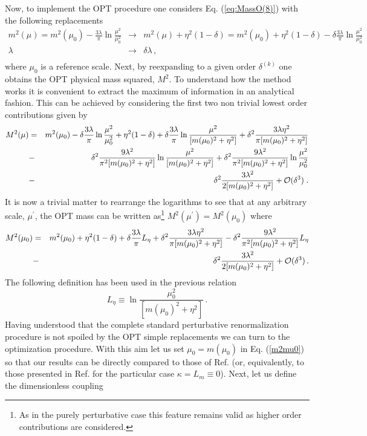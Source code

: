 \documentclass[a4paper,11pt]{article}
\def\nn{\nonumber}
\def\be{\begin{equation}}
\def\ee{\end{equation}}
\def\bea{\begin{eqnarray}}
\def\eea{\end{eqnarray}}
\def\lm{L_m}
\def\leta{L_\eta}
\begin{document}
Now, to implement the OPT procedure one considers Eq. (\ref {eq:MassO(8)}) with the following  replacements \cite{opt_phi4}
\bea\label{eq:OPT}
m^2(\mu)= m^2(\mu_0) -   \frac{3\lambda}{\pi}\ln{\frac{\mu^2}{\mu_0^2}} &\longrightarrow& m^2(\mu) + \eta^2(1-\delta) = m^2(\mu_0) + \eta^2(1-\delta)- \delta  \frac{3\lambda}{\pi}\ln{\frac{\mu^2}{\mu_0^2}} \nn \\ \nn
\lambda &\longrightarrow& \delta\lambda \,,\\
\label{replaceOPT}
\eea
where $\mu_0$ is a reference scale. Next,  by reexpanding to a given order $\delta^{(k)}$ one obtains the OPT physical mass squared, $M^2$. To understand how the method works it is convenient to extract the maximum of information in an analytical fashion. This can be achieved by considering the first two non trivial lowest order  contributions given by
\bea\label{eq:MassO(2)}
M^2(\mu)& = & m^2(\mu_0)  - \delta  \frac{3\lambda}{\pi}\ln{\frac{\mu^2}{\mu_0^2}} + \eta^2 (1- \delta) + \delta \frac{3\lambda}{\pi} \ln{\frac{\mu^2}{[m(\mu_0)^2+\eta^2]}}+ \delta^2  \frac{3\lambda \eta^2}{\pi[m(\mu_0)^2+\eta^2]}  \nn \\
&-& \delta^2 \frac{9\lambda^2}{\pi^2[m(\mu_0)^2+\eta^2]}\ln{\frac{\mu^2}{[m(\mu_0)^2+\eta^2]}}+\delta^2 \frac{9\lambda^2}{\pi^2[m(\mu_0)^2+\eta^2]}\ln \frac{\mu^2}{\mu_0^2}
\nn \\
&-& \delta^2 \frac{3\lambda^2}{2[m(\mu_0)^2+\eta^2]} + {\cal O}(\delta^3) \;. 
\label{M2mus}
\eea
 It is now a trivial matter to rearrange the logarithms to see that at any arbitrary scale, $\mu^\prime$, the  OPT mass can be written as\footnote {As in the purely perturbative case this feature remains valid as higher order contributions are considered.} $M^2(\mu^\prime) = M^2(\mu_0)$ where
\bea\label{eq:MassO(2)RG}
M^2(\mu_0) &=& m^2(\mu_0)   + \eta^2 (1- \delta) + \delta \frac{3\lambda}{\pi}\leta + \delta^2  \frac{3\lambda \eta^2}{\pi[m(\mu_0)^2+\eta^2]} - \delta^2 \frac{9\lambda^2}{\pi^2[m(\mu_0)^2+\eta^2]}\leta \nn \\
&-&  \delta^2 \frac{3\lambda^2}{2[m(\mu_0)^2+\eta^2]} + {\cal O}(\delta^3) \,.
\label{m2mu0}
\eea
The following definition has been used in the previous relation 
\be\label{eq:Leta}
 L_\eta \equiv \ln{\frac{\mu_0^2}{[m(\mu_0)^2+\eta^2]}} \,.
\ee
Having understood that the complete standard perturbative renormalization procedure is not spoiled by the OPT simple replacements we can turn to the optimization procedure. With this aim let us set $ \mu_0 = m(\mu_0)$ in Eq. (\ref {m2mu0}) so that our results can be directly compared to those of Ref. \cite {serone1} (or, equivalently, to those presented in Ref. \cite {serone3}  for the particular  case $\kappa = \lm \equiv 0$). Next, let us define the dimensionless coupling
\end{document}
